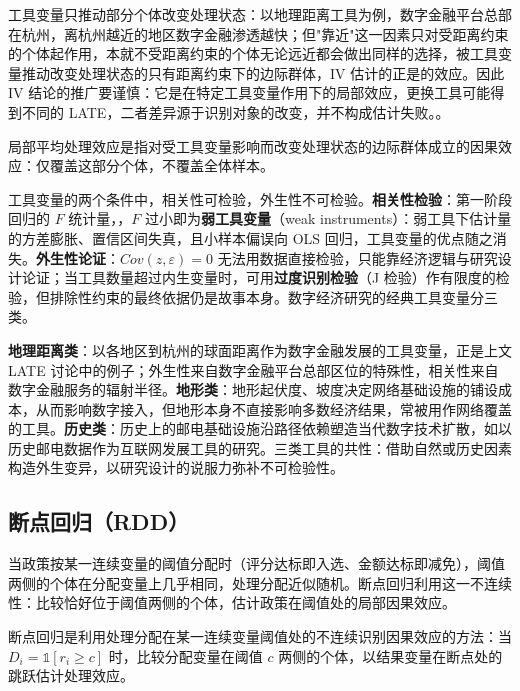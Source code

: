 工具变量只推动部分个体改变处理状态：以地理距离工具为例，数字金融平台总部在杭州，离杭州越近的地区数字金融渗透越快；但"靠近"这一因素只对受距离约束的个体起作用，本就不受距离约束的个体无论远近都会做出同样的选择，被工具变量推动改变处理状态的只有距离约束下的边际群体，IV 估计的正是的效应。因此 IV 结论的推广要谨慎：它是在特定工具变量作用下的局部效应，更换工具可能得到不同的 LATE，二者差异源于识别对象的改变，并不构成估计失败。。

\begin{definition}
局部平均处理效应是指对受工具变量影响而改变处理状态的边际群体成立的因果效应：仅覆盖这部分个体，不覆盖全体样本。
\end{definition}

工具变量的两个条件中，相关性可检验，外生性不可检验。\textbf{相关性检验}：第一阶段回归的 $F$ 统计量，，$F$ 过小即为\textbf{弱工具变量}（weak instruments）：弱工具下估计量的方差膨胀、置信区间失真，且小样本偏误向 OLS 回归，工具变量的优点随之消失。\textbf{外生性论证}：$Cov(z, \varepsilon) = 0$ 无法用数据直接检验，只能靠经济逻辑与研究设计论证；当工具数量超过内生变量时，可用\textbf{过度识别检验}（J 检验）作有限度的检验，但排除性约束的最终依据仍是故事本身。数字经济研究的经典工具变量分三类。

\textbf{地理距离类}：以各地区到杭州的球面距离作为数字金融发展的工具变量，正是上文 LATE 讨论中的例子；外生性来自数字金融平台总部区位的特殊性，相关性来自数字金融服务的辐射半径。\textbf{地形类}：地形起伏度、坡度决定网络基础设施的铺设成本，从而影响数字接入，但地形本身不直接影响多数经济结果，常被用作网络覆盖的工具。\textbf{历史类}：历史上的邮电基础设施沿路径依赖塑造当代数字技术扩散，如以历史邮电数据作为互联网发展工具的研究。三类工具的共性：借助自然或历史因素构造外生变异，以研究设计的说服力弥补不可检验性。

\subsection{断点回归（RDD）}

当政策按某一连续变量的阈值分配时（评分达标即入选、金额达标即减免），阈值两侧的个体在分配变量上几乎相同，处理分配近似随机。断点回归利用这一不连续性：比较恰好位于阈值两侧的个体，估计政策在阈值处的局部因果效应。

\begin{definition}
断点回归是利用处理分配在某一连续变量阈值处的不连续识别因果效应的方法：当 $D_i = \mathbb{1}[r_i \geq c]$ 时，比较分配变量在阈值 $c$ 两侧的个体，以结果变量在断点处的跳跃估计处理效应。
\end{definition}


